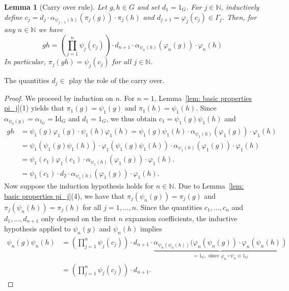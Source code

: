 \documentclass[titlepage,reqno,10pt]{amsart}
\newtheorem{lemma}[theorem]{Lemma}
\theoremstyle{definition}
\def\N{{\mathbb N}}
\begin{document}
\begin{lemma}[Carry over rule]\label{lem: carry over rule}
Let $g,h \in G$ and set $d_1 = 1_G$. 
For $j\in \N$, inductively define $c_j = d_j\cdot \alpha_{\psi_{j-1}(h)}(\pi_j(g)) \cdot \pi_j(h) $ and $d_{j+1} = \varphi_j(c_j) \in \Gamma_j$.
Then, for any $n\in\N$ we have  
\begin{equation} \label{eq: product expansion formula}
gh = \left(\prod_{j=1}^n \psi_j(c_j)\right)\cdot d_{n+1}\cdot \alpha_{\psi_n(h)}(\varphi_n(g))\cdot \varphi_n(h)
\end{equation} 
In particular, $\pi_j(gh) = \psi_j(c_j)$ for all $j\in\N$.

\end{lemma}
The quantities $d_{j}\in $ play the role of the carry over.
\begin{proof}
We proceed by induction on $n$. 
For $n=1$, Lemma~\ref{lem: basic properties pi_j}(1) yields that $\pi_1(g) = \psi_1(g)$ and $\pi_1(h) = \psi_1(h)$.
Since $\alpha_{\psi_0(g)} = \alpha_{1_G}=\mathrm{Id}_G$ and $d_1=1_G$, we thus obtain $c_1 = \psi_1(g)\psi_1(h)$ and
\begin{align*}
    gh &= \psi_1(g)\varphi_1(g) \cdot \psi_1(h) \varphi_1(h)= \psi_1(g)\psi_1(h)\cdot \alpha_{\psi_1(h)}(\varphi_1(g)) \cdot \varphi_1(h)\\
    &=  \psi_1(\psi_1(g)\psi_1(h))\cdot \varphi_1(\psi_1(g)\psi_1(h))\cdot \alpha_{\psi_1(h)}(\varphi_1(g))\cdot \varphi_1(h) \\
    &= \psi_1(c_1)\varphi_1(c_1)\cdot \alpha_{\psi_1(h)}(\varphi_1(g)) \cdot\varphi_1(h).\\
    &= \psi_1(c_1)\cdot d_2\cdot \alpha_{\psi_1(h)}(\varphi_1(g)) \cdot\varphi_1(h).
\end{align*}
Now suppose the induction hypothesis holds for $n\in \N$. Due to Lemma~\ref{lem: basic properties pi_j}(4), we have that $\pi_j(\psi_n(g))=\pi_j(g)$ and $\pi_j(\psi_n(h))=\pi_j(h)$ for all $j=1,\ldots,n$. Since the quantities $c_1,\ldots , c_n$ and $d_1,\ldots , d_{n+1}$ only depend on the first $n$ expansion coefficients, the inductive hypothesis applied to $\psi_n(g)$ and $\psi_n(h)$ implies 
\begin{align} \label{eq: expansion inductive hypothesis application} \psi_n(g)\psi_n(h) &= \left(\prod_{j=1}^n \psi_ j(c_j)\right)\cdot d_{n+1}\cdot \nonumber\underbrace{\alpha_{\psi_n(\psi_n(h))}(\varphi_n(\psi_n(g))\cdot \varphi_n(\psi_n(h))}_{=1_G,\textrm{ since } \varphi_n\circ\psi_n\equiv1_G} \\ & = \left(\prod_{j=1}^n \psi_ j(c_j)\right)\cdot d_{n+1}.

\end{align}
\end{proof}
\end{document}
